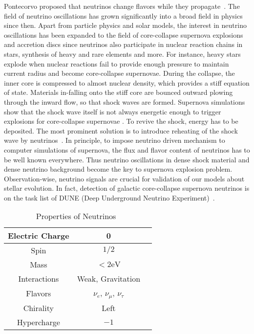 Pontecorvo proposed that neutrinos change flavors while they propagate~\cite{Pontecorvo1968}. The field of neutrino oscillations has grown significantly into a broad field in physics since then. Apart from particle physics and solar models, the interest in neutrino oscillations has been expanded to the field of core-collapse supernova explosions and accretion discs since neutrinos also participate in nuclear reaction chains in stars, synthesis of heavy and rare elements and more. For instance, heavy stars explode when nuclear reactions fail to provide enough pressure to maintain current radius and become core-collapse supernovae. During the collapse, the inner core is compressed to almost nuclear density, which provides a stiff equation of state. Materials in-falling onto the stiff core are bounced outward plowing through the inward flow, so that shock waves are formed. Supernova simulations show that the shock wave itself is not always energetic enough to trigger explosions for core-collapse supernovae \cite{Janka2016b}. To revive the shock, energy has to be deposited. The most prominent solution is to introduce reheating of the shock wave by neutrinos~\cite{Janka2016b}. In principle, to impose neutrino driven mechanism to computer simulations of supernova, the flux and flavor content of neutrinos has to be well known everywhere. Thus neutrino oscillations in dense shock material and dense neutrino background become the key to supernova explosion problem. Observation-wise, neutrino signals are crucial for validation of our models about stellar evolution. In fact, detection of galactic core-collapse supernova neutrinos is on the task list of DUNE (Deep Underground Neutrino Experiment)~\cite{Kemp2017}.

\begin{table}[ht]
\centering
 \begin{tabular}{|c | c | c|}
 \hline
  Electric Charge & 0\\
  \hline
  Spin & $1/2$ \\
\hline
 Mass & $<2\mathrm{eV}$  \\
 \hline
 Interactions & Weak, Gravitation  \\
 \hline
 Flavors & $\nu_e$, $\nu_\mu$, $\nu_\tau$ \\
 \hline
 Chirality & Left \\
 \hline
 Hypercharge & $-1$ \\
 \hline

 \end{tabular}
 \caption{Properties of Neutrinos~\cite{Patrignani:2016xqp}}
\label{table:neutrino-properties}
\end{table}


